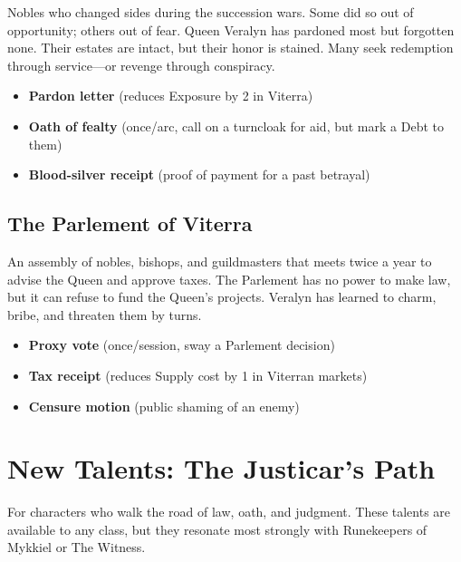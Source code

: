 \documentclass[11pt,twoside]{book}
\newenvironment{sidebar}[1][]
{\begin{tcolorbox}[colback=agedpaper,colframe=royalblue,boxrule=0.5pt,arc=2mm,title={\scshape\small #1},fonttitle=\bfseries,breakable]}
{\end{tcolorbox}}
\newcommand{\ornament}{\par\centering\adforn{36}\par}
\begin{document}
Nobles who changed sides during the succession wars. Some did so out of opportunity; others out of fear. Queen Veralyn has pardoned most but forgotten none. Their estates are intact, but their honor is stained. Many seek redemption through service---or revenge through conspiracy.

\begin{sidebar}[Strings]
\begin{itemize}
    \item \textbf{Pardon letter} (reduces Exposure by 2 in Viterra)
    \item \textbf{Oath of fealty} (once/arc, call on a turncloak for aid, but mark a Debt to them)
    \item \textbf{Blood-silver receipt} (proof of payment for a past betrayal)
\end{itemize}
\end{sidebar}

\section{The Parlement of Viterra}

An assembly of nobles, bishops, and guildmasters that meets twice a year to advise the Queen and approve taxes. The Parlement has no power to make law, but it can refuse to fund the Queen's projects. Veralyn has learned to charm, bribe, and threaten them by turns.

\begin{sidebar}[Strings]
\begin{itemize}
    \item \textbf{Proxy vote} (once/session, sway a Parlement decision)
    \item \textbf{Tax receipt} (reduces Supply cost by 1 in Viterran markets)
    \item \textbf{Censure motion} (public shaming of an enemy)
\end{itemize}
\end{sidebar}

\ornament

\chapter{New Talents: The Justicar's Path}

For characters who walk the road of law, oath, and judgment. These talents are available to any class, but they resonate most strongly with Runekeepers of Mykkiel or The Witness.
\end{document}
